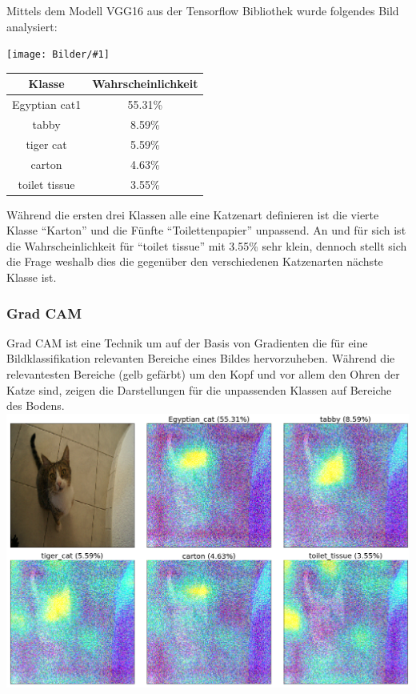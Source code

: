 \documentclass[
  12pt, %
  a4paper, %
  oneside, %
  openany, 
  numbers=noenddot, %
  BCOR=5mm, %
  parskip=half*, %
  thesis, %
]{bfhbook}
\newcommand{\imgText}[2]{
\begin{center}
    \begin{minipage}[t]{0.6\textwidth}
    		\vspace{0pt}
		\texttt{[image: Bilder/\#1]}
	\end{minipage}\hfill
    \begin{minipage}[t]{0.4\textwidth}
    		\vspace{0pt}
  		#2
    \end{minipage}
\end{center}
}
\begin{document}
Mittels dem Modell VGG16 aus der Tensorflow Bibliothek \cite{vgg16} wurde folgendes Bild analysiert:
\imgText{Mira.jpg}{
		\begin{tabular}{ |c|c| } 
		 \hline
		 Klasse & Wahrscheinlichkeit \\
		 \hline
		 Egyptian cat1 & 55.31\% \\ 
		 tabby & 8.59\% \\ 
		 tiger cat & 5.59\% \\ 
		 carton & 4.63\% \\
		 toilet tissue & 3.55\% \\
		 \hline
		\end{tabular}
		\break
		Während die ersten drei Klassen alle eine Katzenart definieren ist die vierte Klasse ``Karton'' und die Fünfte ``Toilettenpapier'' unpassend. An und für sich ist die Wahrscheinlichkeit für ``toilet tissue'' mit 3.55\% sehr klein, dennoch stellt sich die Frage weshalb dies die gegenüber den verschiedenen Katzenarten nächste Klasse ist.
}

\subsubsection*{Grad CAM} \break
\Gls{Grad CAM} ist eine Technik \parencite{Selvaraju2016} um auf der Basis von Gradienten die für eine Bildklassifikation relevanten Bereiche eines Bildes hervorzuheben. Während die relevantesten Bereiche (gelb gefärbt) um den Kopf und vor allem den Ohren der Katze sind, zeigen die Darstellungen für die unpassenden Klassen auf Bereiche des Bodens.
\includegraphics[width=\textwidth]{Bilder/Grad-Cam-Classes.png}
\end{document}
